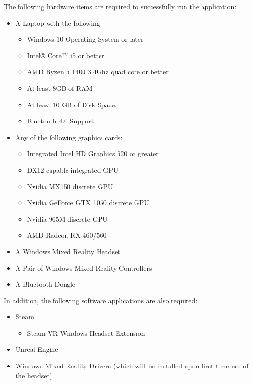 \documentclass[onecolumn, draftclsnofoot,10pt, compsoc]{IEEEtran}
\begin{document}
The following hardware items are required to successfully run the application:

\begin{itemize}
    \item A Laptop with the following:
        \begin{itemize}
            \item Windows 10 Operating System or later
            \item Intel® Core™ i5 or better
            \item AMD Ryzen 5 1400 3.4Ghz quad core or better
            \item At least 8GB of RAM
            \item At least 10 GB of Disk Space.
            \item Bluetooth 4.0 Support 
        \end{itemize}
    \item Any of the following graphics cards: 
        \begin{itemize}
            \item Integrated Intel HD Graphics 620 or greater 
            \item DX12-capable integrated GPU
            \item Nvidia MX150 discrete GPU
            \item Nvidia GeForce GTX 1050 discrete GPU
            \item Nvidia 965M discrete GPU
            \item AMD Radeon RX 460/560
        \end{itemize}
    \item A Windows Mixed Reality Headset
    \item A Pair of Windows Mixed Reality Controllers
    \item A Bluetooth Dongle
\end{itemize}


In addition, the following software applications are also required: 
\begin{itemize}
    \item Steam 
        \begin{itemize}
            \item Steam VR Windows Headset Extension
        \end{itemize}
    \item Unreal Engine %
    \item Windows Mixed Reality Drivers (which will be installed upon first-time use of the headset)
\end{itemize}
\end{document}

